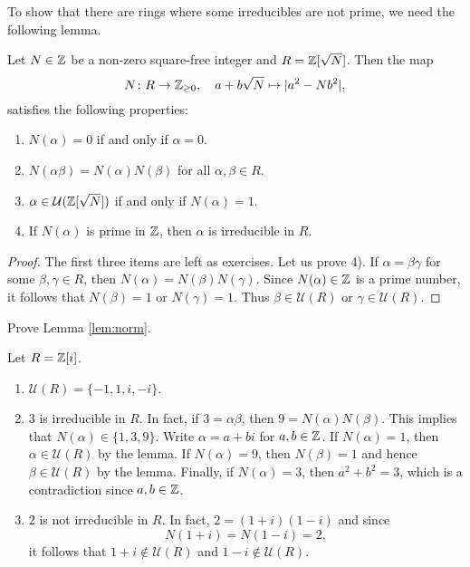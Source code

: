 To show that there are rings where some irreducibles are not prime, 
we need the following lemma. 

\begin{lemma}
\label{lem:norm}
Let $N\in\mathbb{Z}$ be a non-zero square-free integer and $R=\mathbb{Z}[\sqrt{N}]$. Then 
the map 
\[
	N\colon R\to\mathbb{Z}_{\geq0},
\quad a+b\sqrt{N}\mapsto 
|a^2-Nb^2|,
\]
satisfies the following properties:
\begin{enumerate}
	\item $N(\alpha)=0$ if and only if $\alpha=0$. 
	\item $N(\alpha\beta)=N(\alpha)N(\beta)$ for all $\alpha,\beta\in R$. 
	\item $\alpha\in\mathcal{U}(\mathbb{Z}[\sqrt{N}])$ if and only if $N(\alpha)=1$. 
	\item If $N(\alpha)$ is prime in $\mathbb{Z}$, then $\alpha$ is irreducible in $R$. 
\end{enumerate}	
\end{lemma}

\begin{proof}
	The first three items are left as exercises. Let us prove 4). 
	If $\alpha=\beta\gamma$ for some $\beta,\gamma\in R$, then
	$N(\alpha)=N(\beta)N(\gamma)$. Since $N(\alpha)\in\mathbb{Z}$ is a prime number, it follows that
	$N(\beta)=1$ or $N(\gamma)=1$. Thus $\beta\in\mathcal{U}(R)$ or $\gamma\in\mathcal{U}(R)$. 	
\end{proof}

\begin{exercise}
Prove Lemma \ref{lem:norm}.
\end{exercise}

\begin{example}
	Let $R=\mathbb{Z}[i]$. 
	\begin{enumerate}
		\item $\mathcal{U}(R)=\{-1,1,i,-i\}$.
		\item $3$ is irreducible in $R$. In fact, if $3=\alpha\beta$, then
			$9=N(\alpha)N(\beta)$. This implies that $N(\alpha)\in\{1,3,9\}$. Write
			$\alpha=a+bi$ for $a,b\in\mathbb{Z}$. If $N(\alpha)=1$, then $\alpha\in\mathcal{U}(R)$ by the lemma. 
			If $N(\alpha)=9$, then $N(\beta)=1$ and hence $\beta\in\mathcal{U}(R)$ by the lemma. Finally, 
			if $N(\alpha)=3$, then $a^2+b^2=3$, which is a contradiction since $a,b\in\mathbb{Z}$. 
		\item $2$ is not irreducible in $R$. In fact, $2=(1+i)(1-i)$ and
			since \[
			N(1+i)=N(1-i)=2,
			\]
			it follows that $1+i\not\in\mathcal{U}(R)$ 
			and $1-i\not\in\mathcal{U}(R)$. 
	\end{enumerate}	
\end{example}

